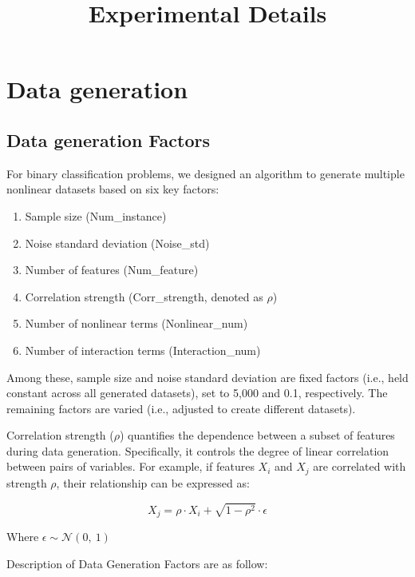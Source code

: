 \documentclass{article}
\begin{document}
\title{Experimental Details}
\maketitle
\section{Data generation}

\subsection{Data generation Factors}

For binary classification problems, we designed an algorithm to generate multiple nonlinear datasets based on six key factors:

\begin{enumerate}
    \item Sample size (Num\_instance)
    \item Noise standard deviation (Noise\_std)
    \item Number of features (Num\_feature)
    \item Correlation strength (Corr\_strength, denoted as $\rho$)
    \item Number of nonlinear terms (Nonlinear\_num)
    \item Number of interaction terms (Interaction\_num)
\end{enumerate}

Among these, sample size and noise standard deviation are fixed factors (i.e., held constant across all generated datasets), set to 5,000 and 0.1, respectively. The remaining factors are varied (i.e., adjusted to create different datasets).

Correlation strength ($\rho$) quantifies the dependence between a subset of features during data generation. Specifically, it controls the degree of linear correlation between pairs of variables. For example, if features $X_{i}$ and $X_{j}$ are correlated with strength $\rho$, their relationship can be expressed as:

$$X_{j} = \rho \cdot X_{i} + \sqrt{1 - \rho^{2}} \cdot \epsilon$$

Where $\epsilon\sim\mathcal{N}(0,\ 1)$

Description of Data Generation Factors are as follow:
\end{document}
